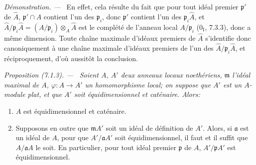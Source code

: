 \documentclass[10pt,oneside]{book}
\newenvironment{proposition}[1][]{%
  \par\medskip\noindent\itshape Proposition (#1). ---\ }{\par}
\newenvironment{proof}{%
  \par\medskip\noindent\textit{Démonstration. ---\ }}{\par}
\begin{document}
\begin{proof}
En effet, cela résulte du fait que pour tout idéal premier $\mathfrak p'$ de
$\widehat A$, $\mathfrak p'\cap A$ contient l'un des $\mathfrak p_i$, donc
$\mathfrak p'$ contient l'un des $\mathfrak p_i\widehat A$, et
$\widehat A/\mathfrak p_i\widehat A=(A/\mathfrak p_i)\otimes_A\widehat A$
est le complété de l'anneau local $A/\mathfrak p_i$ (0$_{\mathrm I}$,
7.3.3), donc a même dimension. Toute chaîne maximale d'idéaux premiers de
$\widehat A$ s'identifie donc canoniquement à une chaîne maximale d'idéaux
premiers de l'un des $\widehat A/\mathfrak p_i\widehat A$, et réciproquement,
d'où aussitôt la conclusion.
\end{proof}

\begin{proposition}[7.1.3]
\label{IV.2.s7.1.3-fr}
Soient $A$, $A'$ deux anneaux locaux noethériens, $\mathfrak m$ l'idéal
maximal de $A$, $\varphi:A\to A'$ un homomorphisme local; on suppose que $A'$
est un $A$-module plat, et que $A'$ soit équidimensionnel et caténaire. Alors:
\begin{enumerate}
\item[(i)] $A$ est équidimensionnel et caténaire.
\item[(ii)] Supposons en outre que $\mathfrak mA'$ soit un idéal de définition de
$A'$. Alors, si $\mathfrak a$ est un idéal de $A$, pour que
$A'/\mathfrak aA'$ soit équidimensionnel, il faut et il suffit que
$A/\mathfrak aA$ le soit. En particulier, pour tout idéal premier
$\mathfrak p$ de $A$, $A'/\mathfrak pA'$ est équidimensionnel.
\end{enumerate}
\end{proposition}
\end{document}
